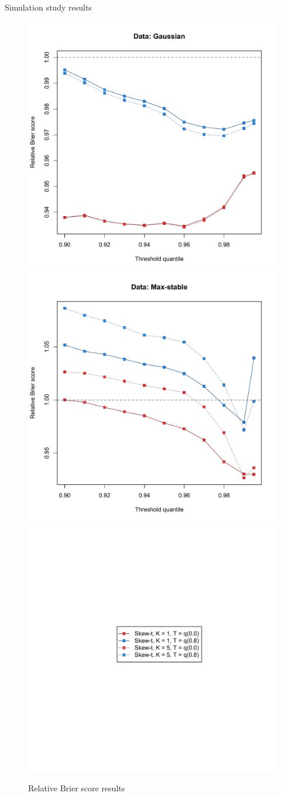 \documentclass{beamer}
\begin{document}
\begin{frame}{Simulation study results}
\centering
  \begin{figure}
    \includegraphics[width=0.45\linewidth]{./plots/pot/bs-sim-gaus.pdf}
    \includegraphics[width=0.45\linewidth]{./plots/pot/bs-sim-max.pdf} \\
    \includegraphics[width=0.3\linewidth, trim=2in 3.25in 2in 3in]{./plots/pot/bs-sim-legend.pdf}
    \caption{Relative Brier score results}
  \end{figure}
\end{frame}
\end{document}
